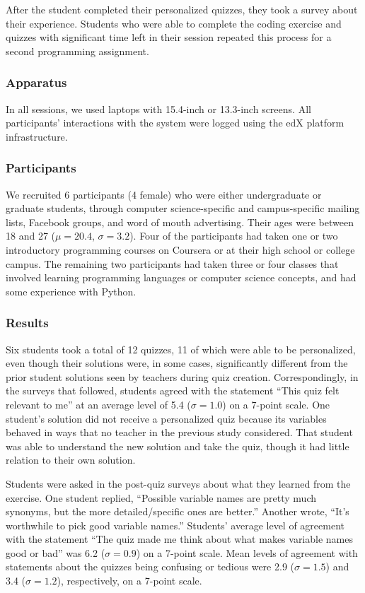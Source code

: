 After the student completed their personalized quizzes, they took a survey about their experience. Students who were able to complete the coding exercise and quizzes with significant time left in their session repeated this process for a second programming assignment.

\subsubsection{Apparatus}

In all sessions, we used laptops with 15.4-inch or 13.3-inch screens. All participants' interactions with the system were logged using the edX platform infrastructure.

\subsubsection{Participants}

We recruited 6 participants (4 female) who were either undergraduate or graduate students, through computer science-specific and campus-specific mailing lists, Facebook groups, and word of mouth advertising. Their ages were between 18 and 27 ($\mu=20.4$, $\sigma=3.2$). Four of the participants had taken one or two introductory programming courses on Coursera or at their high school or college campus. The remaining two participants had taken three or four classes that involved learning programming languages or computer science concepts, and had some experience with Python.

\subsubsection{Results}

Six students took a total of 12 quizzes, 11 of which were able to be personalized, even though their solutions were, in some cases, significantly different from the prior student solutions seen by teachers during quiz creation. Correspondingly, in the surveys that followed, students agreed with the statement ``This quiz felt relevant to me'' at an average level of 5.4 ($\sigma = 1.0$) on a 7-point scale. One student's solution did not receive a personalized quiz because its variables behaved in ways that no teacher in the previous study considered. That student was able to understand the new solution and take the quiz, though it had little relation to their own solution.

Students were asked in the post-quiz surveys about what they learned from the exercise. One student replied, ``Possible variable names are pretty much synonyms, but the more detailed/specific ones are better.'' Another wrote, ``It's worthwhile to pick good variable names.'' Students' average level of agreement with the statement ``The quiz made me think about what makes variable names good or bad'' was 6.2 ($\sigma = 0.9$) on a 7-point scale. Mean levels of agreement with statements about the quizzes being confusing or tedious were 2.9 ($\sigma = 1.5$) and 3.4 ($\sigma = 1.2$), respectively, on a 7-point scale.

